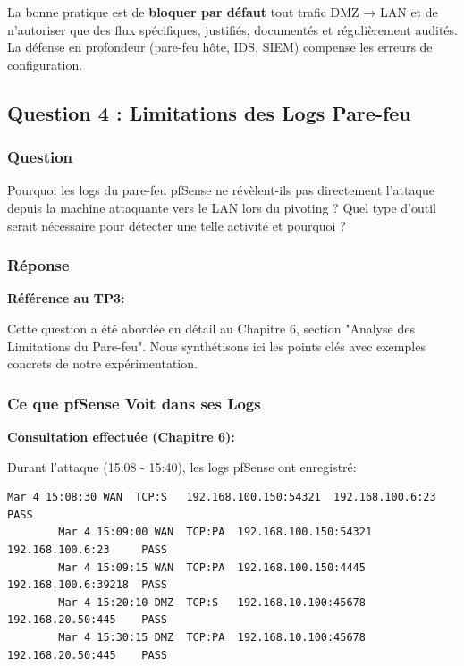 \documentclass[12pt,a4paper,openany]{report}
\begin{document}
	La bonne pratique est de \textbf{bloquer par défaut} tout trafic DMZ → LAN 
	et de n'autoriser que des flux spécifiques, justifiés, documentés et 
	régulièrement audités. La défense en profondeur (pare-feu hôte, IDS, 
	SIEM) compense les erreurs de configuration.
	
	
	\subsection{Question 4 : Limitations des Logs Pare-feu}
	
	\subsubsection{Question}
	
	Pourquoi les logs du pare-feu pfSense ne révèlent-ils pas directement 
	l'attaque depuis la machine attaquante vers le LAN lors du pivoting ? 
	Quel type d'outil serait nécessaire pour détecter une telle activité 
	et pourquoi ?
	
	\subsubsection{Réponse}
	
	\textbf{Référence au TP3:}
	
	Cette question a été abordée en détail au Chapitre 6, section "Analyse 
	des Limitations du Pare-feu". Nous synthétisons ici les points clés 
	avec exemples concrets de notre expérimentation.
	
	\subsubsection{Ce que pfSense Voit dans ses Logs}
	
	\textbf{Consultation effectuée (Chapitre 6):}
	
	Durant l'attaque (15:08 - 15:40), les logs pfSense ont enregistré:
	
	\begin{lstlisting}[style=logstyle]
		Mar 4 15:08:30 WAN  TCP:S   192.168.100.150:54321  192.168.100.6:23     PASS
		Mar 4 15:09:00 WAN  TCP:PA  192.168.100.150:54321  192.168.100.6:23     PASS
		Mar 4 15:09:15 WAN  TCP:PA  192.168.100.150:4445   192.168.100.6:39218  PASS
		Mar 4 15:20:10 DMZ  TCP:S   192.168.10.100:45678   192.168.20.50:445    PASS
		Mar 4 15:30:15 DMZ  TCP:PA  192.168.10.100:45678   192.168.20.50:445    PASS
	\end{lstlisting}
	
\end{document}
